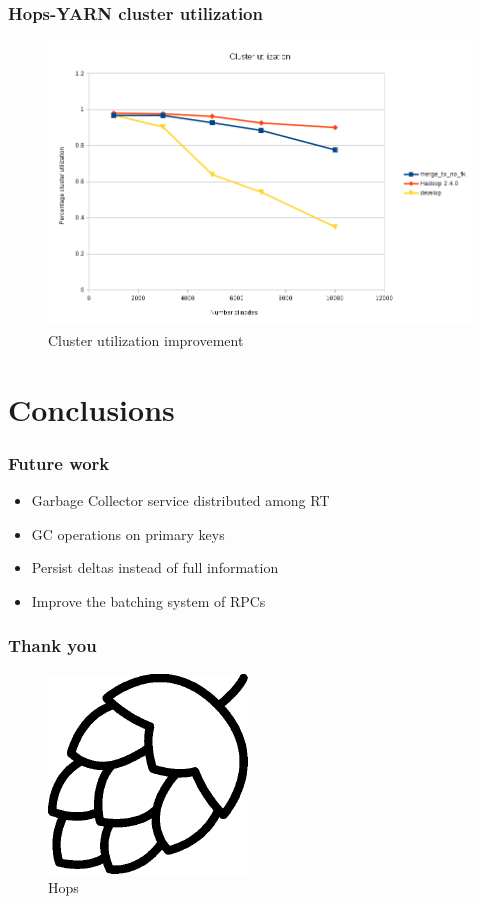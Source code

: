 \documentclass{beamer}
\begin{document}
\begin{frame}
\frametitle{Hops-YARN cluster utilization}

\begin{figure}
\centering
\includegraphics[scale=0.4]{resources/hopsyarn_cluster_util.png}
\caption{Cluster utilization improvement}
\end{figure}
\end{frame}

\section{Conclusions}
\begin{frame}
\frametitle{Future work}

\begin{itemize}
\item Garbage Collector service distributed among RT
\item GC operations on primary keys
\item Persist deltas instead of full information
\item Improve the batching system of RPCs
\end{itemize}
\end{frame}

\begin{frame}
\frametitle{Thank you}

\begin{figure}
\centering
\includegraphics[scale=0.2]{resources/hops_logo.png}
\caption*{Hops}
\end{figure}

\end{frame}
\end{document}
